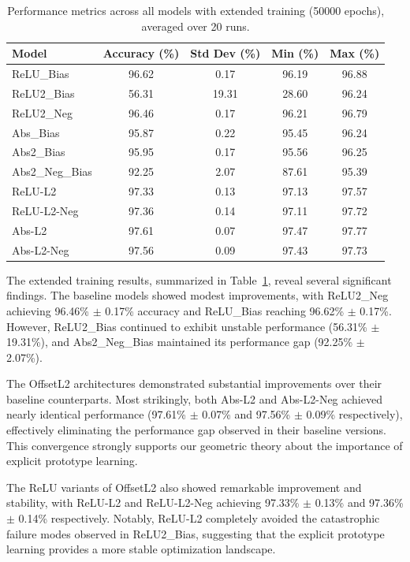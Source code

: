 \begin{table}[ht]
    \centering
    \begin{tabular}{lcccc}
    \toprule
    \textbf{Model} & \textbf{Accuracy (\%)} & \textbf{Std Dev (\%)} & \textbf{Min (\%)} & \textbf{Max (\%)} \\
    \midrule
    ReLU\_Bias & 96.62 & 0.17 & 96.19 & 96.88 \\
    ReLU2\_Bias & 56.31 & 19.31 & 28.60 & 96.24 \\
    ReLU2\_Neg & 96.46 & 0.17 & 96.21 & 96.79 \\
    Abs\_Bias & 95.87 & 0.22 & 95.45 & 96.24 \\
    Abs2\_Bias & 95.95 & 0.17 & 95.56 & 96.25 \\
    Abs2\_Neg\_Bias & 92.25 & 2.07 & 87.61 & 95.39 \\
    \midrule
    ReLU-L2 & 97.33 & 0.13 & 97.13 & 97.57 \\
    ReLU-L2-Neg & 97.36 & 0.14 & 97.11 & 97.72 \\
    Abs-L2 & 97.61 & 0.07 & 97.47 & 97.77 \\
    Abs-L2-Neg & 97.56 & 0.09 & 97.43 & 97.73 \\
    \bottomrule
    \end{tabular}
    \caption{Performance metrics across all models with extended training (50000 epochs), averaged over 20 runs.}
    \label{tab:extended_training}
\end{table}

The extended training results, summarized in Table~\ref{tab:extended_training}, reveal several significant findings. The baseline models showed modest improvements, with ReLU2\_Neg achieving 96.46\% $\pm$ 0.17\% accuracy and ReLU\_Bias reaching 96.62\% $\pm$ 0.17\%. However, ReLU2\_Bias continued to exhibit unstable performance (56.31\% $\pm$ 19.31\%), and Abs2\_Neg\_Bias maintained its performance gap (92.25\% $\pm$ 2.07\%).

The OffsetL2 architectures demonstrated substantial improvements over their baseline counterparts. Most strikingly, both Abs-L2 and Abs-L2-Neg achieved nearly identical performance (97.61\% $\pm$ 0.07\% and 97.56\% $\pm$ 0.09\% respectively), effectively eliminating the performance gap observed in their baseline versions. This convergence strongly supports our geometric theory about the importance of explicit prototype learning.

The ReLU variants of OffsetL2 also showed remarkable improvement and stability, with ReLU-L2 and ReLU-L2-Neg achieving 97.33\% $\pm$ 0.13\% and 97.36\% $\pm$ 0.14\% respectively. Notably, ReLU-L2 completely avoided the catastrophic failure modes observed in ReLU2\_Bias, suggesting that the explicit prototype learning provides a more stable optimization landscape.

